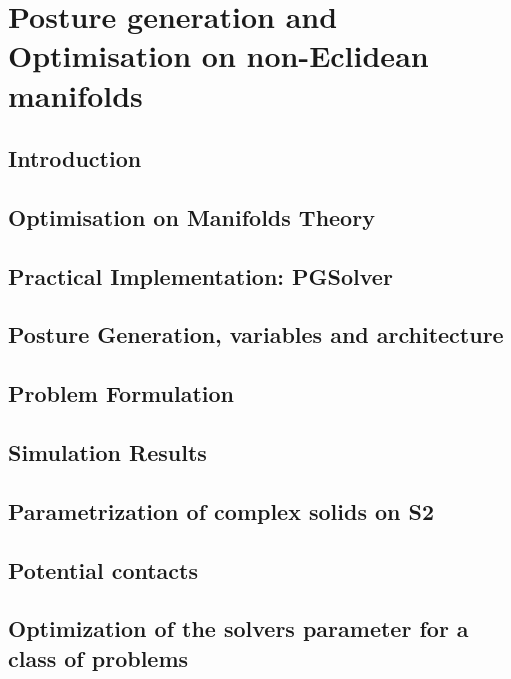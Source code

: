 \chapter{
  Posture generation and Optimisation on non-Eclidean manifolds
}

\section{Introduction}
\label{sec:Introduction}

\section{Optimisation on Manifolds Theory}
\label{sec:Optimisation on Manifolds Theory}

\section{Practical Implementation: PGSolver}
\label{sec:Practical Implementation}

\section{Posture Generation, variables and architecture}
\label{sec:posture_generation_variables_and_architecture}

\section{Problem Formulation}
\label{sec:problem_formulation}

\section{Simulation Results}
\label{sec:simulation_results}

\section{Parametrization of complex solids on S2}
\label{sec:parametrization_of_complex_solids_on_s2}

\section{Potential contacts}
\label{sec:potential_contacts}

\section{Optimization of the solvers parameter for a class of problems}
\label{sec:optimization_of_the_solvers_parameter_for_a_class_of_problems}
